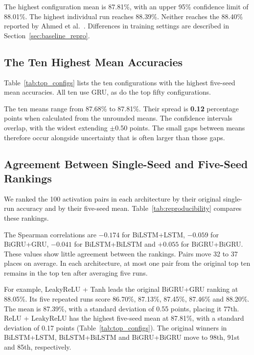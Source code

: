 \documentclass[conference,a4paper]{IEEEtran}
\begin{document}
The highest configuration mean is 87.81\%, with an upper
95\% confidence limit of 88.01\%. The highest individual
run reaches 88.39\%. Neither reaches the 88.40\% reported
by Ahmed et al.~\cite{ahmed2025}. Differences in training
settings are described in Section~\ref{sec:baseline_repro}.

\subsection{The Ten Highest Mean Accuracies}

Table~\ref{tab:top_configs} lists the ten configurations
with the highest five-seed mean accuracies. All ten use
GRU, as do the top fifty configurations.

The ten means range from 87.68\% to 87.81\%. Their spread
is \textbf{0.12} percentage points when calculated from
the unrounded means. The confidence intervals overlap,
with the widest extending $\pm$0.50 points. The small
gaps between means therefore occur alongside uncertainty
that is often larger than those gaps.



\subsection{Agreement Between Single-Seed and Five-Seed Rankings}

We ranked the 100 activation pairs in each architecture
by their original single-run accuracy and by their
five-seed mean. Table~\ref{tab:reproducibility} compares
these rankings.



The Spearman correlations are $-0.174$ for BiLSTM+LSTM,
$-0.059$ for BiGRU+GRU, $-0.041$ for BiLSTM+BiLSTM and
$+0.055$ for BiGRU+BiGRU. These values show little agreement
between the rankings. Pairs move 32 to 37 places on average.
In each architecture, at most one pair from the original
top ten remains in the top ten after averaging five runs.

For example, LeakyReLU + Tanh leads the original BiGRU+GRU
ranking at 88.05\%. Its five repeated runs score 86.70\%,
87.13\%, 87.45\%, 87.46\% and 88.20\%. The mean is 87.39\%,
with a standard deviation of 0.55 points, placing it 77th.
ReLU + LeakyReLU has the highest five-seed mean at 87.81\%,
with a standard deviation of 0.17 points
(Table~\ref{tab:top_configs}). The original winners in
BiLSTM+LSTM, BiLSTM+BiLSTM and BiGRU+BiGRU move to
98th, 91st and 85th, respectively.
\end{document}
